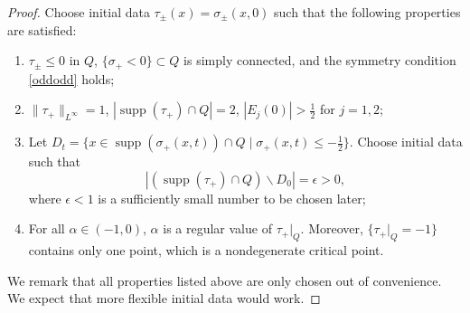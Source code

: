 \documentclass[11pt,reqno]{amsproc}
\newcommand{\la}{\label}
\newcommand{\eps}{\epsilon}
\DeclareMathOperator{\supp}{supp}
\begin{document}
\begin{proof}
    Choose initial data $\tau_\pm(x) = \sigma_\pm(x,0)$ such that the following properties are satisfied:
    \begin{enumerate}
        \item $\tau_\pm \le 0$ in $Q$, $\{\sigma_+ < 0\} \subset Q$ is simply connected, and the symmetry condition \eqref{oddodd} holds;
        \item $\|\tau_+\|_{L^\infty} = 1$, $|\supp(\tau_+)\cap Q| = 2$, $|E_j(0)| > \frac12$ for $j = 1,2$;
        \item Let $D_t = \{x \in \supp(\sigma_+(x,t))\cap Q\;|\; \sigma_+(x,t) \le -\frac12\}$. Choose initial data such that 
            \begin{equation}\la{epschoice}
            |(\supp(\tau_+)\cap Q)\backslash D_0| = \eps > 0,
            \end{equation}
    where $\eps < 1$ is a sufficiently small number to be chosen later;
        \item For all $\alpha \in (-1, 0)$, $\alpha$ is a regular value of $\tau_+|_Q$. Moreover, $\{\tau_+|_Q = -1\}$ contains only one point, which is a nondegenerate critical point.
    \end{enumerate}
    We remark that all properties listed above are only chosen out of convenience. We expect that more flexible initial data would work.
    

\end{proof}
\end{document}
